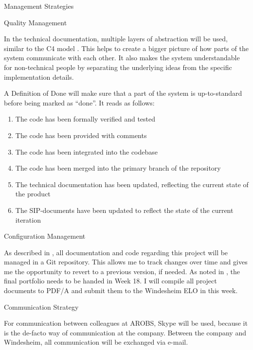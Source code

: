 \documentclass{matthijs}
\begin{document}
\begin{hoofdstuk}{Management Strategies}
\begin{paragraaf}{Quality Management}
			\bigskip

			In the technical documentation, multiple layers of abstraction will be used, similar to the C4 model \cite{brown2018the}.
			This helps to create a bigger picture of how parts of the system communicate with each other.
			It also makes the system understandable for non-technical people by separating the underlying ideas from the specific implementation details.

			\bigskip

			A Definition of Done will make sure that a part of the system is up-to-standard before being marked as \enquote{done}. It reads as follows:
			
			\begin{enumerate}
				\item The code has been formally verified and tested
				\item The code has been provided with comments
				\item The code has been integrated into the codebase
				\item The code has been merged into the primary branch of the repository
				\item The technical documentation has been updated, reflecting the current state of the product
				\item The SIP-documents have been updated to reflect the state of the current iteration
			\end{enumerate}

		\end{paragraaf}

		\begin{paragraaf}{Configuration Management}

			As described in , all documentation and code regarding this project will be managed in a Git repository.
			This allows me to track changes over time and gives me the opportunity to revert to a previous version, if needed.
			As noted in , the final portfolio needs to be handed in Week 18.
			I will compile all project documents to PDF/A and submit them to the Windesheim ELO in this week.
			
		\end{paragraaf}

		\begin{paragraaf}{Communication Strategy}

			For communication between colleagues at AROBS, Skype will be used, because it is the de-facto way of communication at the company.
			Between the company and Windesheim, all communication will be exchanged via e-mail.
			

\end{paragraaf}
\end{hoofdstuk}
\end{document}
